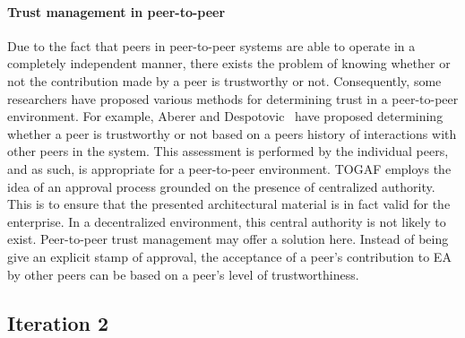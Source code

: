 \paragraph*{Trust management in peer-to-peer}
%
%
Due to the fact that peers in peer-to-peer systems are able to operate in a completely independent manner, there exists the problem of knowing whether or not the contribution made by a peer is trustworthy or not. Consequently, some researchers have proposed various methods for determining trust in a peer-to-peer environment.
%
%
For example, Aberer and Despotovic~\cite{aberer2001managing} have proposed determining whether a peer is trustworthy or not based on a peers history of interactions with other peers in the system. This assessment is performed by the individual peers, and as such, is appropriate for a peer-to-peer environment.
%
%
TOGAF employs the idea of an approval process grounded on the presence of centralized authority. This is to ensure that the presented architectural material is in fact valid for the enterprise. In a decentralized environment, this central authority is not likely to exist. Peer-to-peer trust management may offer a solution here. Instead of being give an explicit stamp of approval, the acceptance of a peer's contribution to EA by other peers can be based on a peer's level of trustworthiness. 
%
% 
%



\subsection{Iteration 2}
\label{sec:design_iteration2}

